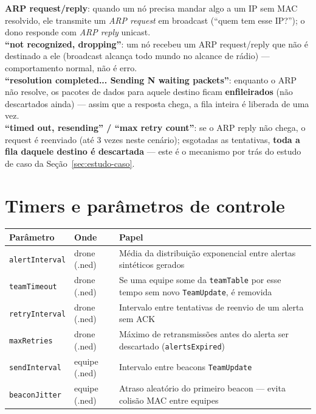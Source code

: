 \documentclass[11pt,a4paper]{article}
\begin{document}
\begin{explica}
\textbf{ARP request/reply}: quando um nó precisa mandar algo a um IP sem
MAC resolvido, ele transmite um \emph{ARP request} em broadcast (``quem
tem esse IP?''); o dono responde com \emph{ARP reply} unicast. \\
\textbf{``not recognized, dropping''}: um nó recebeu um ARP request/reply
que não é destinado a ele (broadcast alcança todo mundo no alcance de
rádio) --- comportamento normal, não é erro. \\
\textbf{``resolution completed... Sending N waiting packets''}: enquanto o
ARP não resolve, os pacotes de dados para aquele destino ficam
\textbf{enfileirados} (não descartados ainda) --- assim que a resposta
chega, a fila inteira é liberada de uma vez. \\
\textbf{``timed out, resending'' / ``max retry count''}: se o ARP reply não
chega, o request é reenviado (até 3 vezes neste cenário); esgotadas as
tentativas, \textbf{toda a fila daquele destino é descartada} --- este é o
mecanismo por trás do estudo de caso da Seção~\ref{sec:estudo-caso}.
\end{explica}

\newpage
\section{Timers e parâmetros de controle}

\begin{center}
\begin{tabular}{@{}llp{7.2cm}@{}}
\toprule
\textbf{Parâmetro} & \textbf{Onde} & \textbf{Papel} \\
\midrule
\texttt{alertInterval} & drone (.ned) & Média da distribuição exponencial entre alertas sintéticos gerados \\
\texttt{teamTimeout}   & drone (.ned) & Se uma equipe some da \texttt{teamTable} por esse tempo sem novo \texttt{TeamUpdate}, é removida \\
\texttt{retryInterval} & drone (.ned) & Intervalo entre tentativas de reenvio de um alerta sem ACK \\
\texttt{maxRetries}    & drone (.ned) & Máximo de retransmissões antes do alerta ser descartado (\texttt{alertsExpired}) \\
\texttt{sendInterval}  & equipe (.ned) & Intervalo entre beacons \texttt{TeamUpdate} \\
\texttt{beaconJitter}  & equipe (.ned) & Atraso aleatório do primeiro beacon --- evita colisão MAC entre equipes \\
\bottomrule
\end{tabular}
\end{center}
\end{document}

